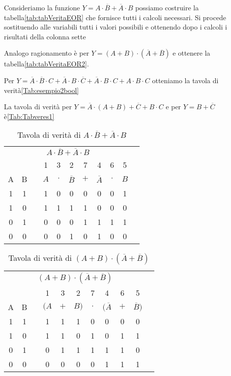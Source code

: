 Consideriamo la funzione $Y=A\cdot\overline{B}+\overline{A}\cdot B$  possiamo costruire la tabella\nobs\vref{tab:tabVeritaEOR} che fornisce tutti i calcoli necessari. Si procede sostituendo alle variabili tutti i valori possibili e ottenendo dopo i calcoli i risultati della colonna sette 

Analogo ragionamento è per $Y=(A+B)\cdot(\overline{A}+\overline{B})$ e ottenere la tabella\nobs\vref{tab:tabVeritaEOR2}.

Per $Y=\overline{A}\cdot\overline{B}\cdot C+\overline{A}\cdot B\cdot\overline{C}+\overline{A}\cdot B\cdot C+A\cdot B\cdot C$ otteniamo la tavola di verità\nobs\vref{Tab:esempio2bool}

La tavola di verità per $Y=\overline{A}\cdot (A+B)+\overline{C}+B\cdot C$ e per $Y=B+\overline{C}$ è\nobs\vref{Tab:Tabveres1}
\begin{table}
	\centering
	\begin{tabular}{ccccccccccc}
		\toprule
		\multicolumn{10}{c}{$A\cdot\overline{B}+\overline{A}\cdot B$} \\ 
		&  &  & 1 & 3 & 2 & 7 & 4 & 6 & 5 \\ 
		A & B &  & $A$&$\cdot$  &$\overline{B}$&$+$& $\overline{A}$ &$\cdot$ &$B$  \\ 
		\cmidrule{1-2}\cmidrule{4-10}
		1 & 1 &  & 1 & 0 & 0 & 0 & 0 & 0 & 1 \\ 
		1 & 0 &  & 1 & 1 & 1 & 1 & 0 & 0 & 0 \\ 
		0 & 1 &  & 0 & 0 & 0 & 1 & 1 & 1 & 1 \\ 
		0 & 0 &  & 0 & 0 & 1 & 0 & 1 & 0 & 0 \\ 
		\bottomrule
	\end{tabular}
	\caption[]{Tavola di verità di $A\cdot\overline{B}+\overline{A}\cdot B$}
	\label{tab:tabVeritaEOR}
\end{table}
\begin{table}
	\centering
	\begin{tabular}{ccccccccccc}
		\toprule
		\multicolumn{10}{c}{$(A+B)\cdot(\overline{A}+\overline{B})$} \\ 
		&  &  & 1 & 3 & 2 & 7 & 4 & 6 & 5 \\ 
		A & B &  & $(A$&$+$  &$B)$ &$\cdot$ &$(\overline{A}$&$+$&$\overline{B})$  \\ 
		\cmidrule{1-2}\cmidrule{4-10}
		1 & 1 &  & 1 & 1 & 1 & 0 & 0 & 0 & 0 \\ 
		1 & 0 &  & 1 & 1 & 0 & 1 & 0 & 1 & 1 \\ 
		0 & 1 &  & 0 & 1 & 1 & 1 & 1 & 1 & 0 \\ 
		0 & 0 &  & 0 & 0 & 0 & 0 & 1 & 1 & 1 \\ 
		\bottomrule
	\end{tabular}
	\caption[]{Tavola di verità di $(A+B)\cdot(\overline{A}+\overline{B})$}
	\label{tab:tabVeritaEOR2}
\end{table}
